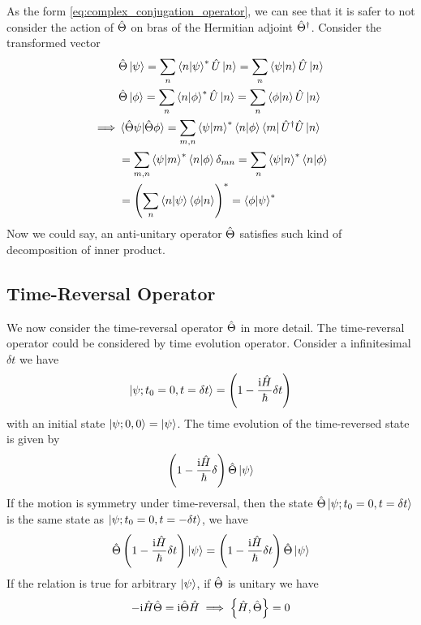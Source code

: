 As the form \cref{eq:complex_conjugation_operator}, we can see that it is safer to not consider the action of $\hat{\Theta}$ on bras of the Hermitian adjoint $\hat{\Theta}^ \dag$. Consider the transformed vector 
\begin{align*}
    &\hat{\Theta} \ket{\psi} = \sum_n \braket{n|\psi}^* \hat{U} \ket{n} = \sum_n \braket{\psi|n} \hat{U} \ket{n} \\
    &\hat{\Theta} \ket{\phi} = \sum_n \braket{n|\phi}^* \hat{U} \ket{n} = \sum_n \braket{\phi|n} \hat{U} \ket{n} \\
    \implies & \braket{\hat{\Theta} \psi|\hat{\Theta} \phi} = \sum_{m,n} \braket{\psi|m}^* \braket{n|\phi} \bra{m} \hat{U}^ \dag \hat{U} \ket{n} \\
    &= \sum_{m,n} \braket{\psi|m}^* \braket{n|\phi} \delta_{mn} = \sum_n \braket{\psi|n}^* \braket{n|\phi} \\
    &= \left( \sum_n \braket{n|\psi} \braket{\phi|n} \right)^* = \braket{\phi|\psi}^*
\end{align*}
Now we could say, an anti-unitary operator $\hat{\Theta}$ satisfies such kind of decomposition of inner product.
\subsection{Time-Reversal Operator}

We now consider the time-reversal operator $\hat{\Theta}$ in more detail. The time-reversal operator could be considered by time evolution operator. Consider a infinitesimal $\delta t$ we have
\begin{align*}
    \ket{\psi;t_0=0,t= \delta t} = \left(1 - \frac{\mathrm{i} \hat{H}}{\hbar} \delta t\right)
\end{align*}
with an initial state $\ket{\psi;0,0} = \ket{\psi}$. The time evolution of the time-reversed state is given by
\begin{align*}
    \left(1 - \frac{\mathrm{i} \hat{H}}{\hbar} \delta\right) \hat{\Theta} \ket{\psi}
\end{align*}
If the motion is symmetry under time-reversal, then the state $\hat{\Theta} \ket{\psi; t_0 =0, t= \delta t}$ is the same state as $\ket{\psi; t_0 =0, t= - \delta t}$, we have
\begin{align*}
    \hat{\Theta} \left(1 - \frac{\mathrm{i} \hat{H}}{\hbar} \delta t\right) \ket{\psi} = \left(1 - \frac{\mathrm{i} \hat{H}}{\hbar} \delta t\right) \hat{\Theta} \ket{\psi}
\end{align*}
If the relation is true for arbitrary $\ket{\psi}$, if $\hat{\Theta}$ is unitary we have
\begin{align*}
    - \mathrm{i} \hat{H} \hat{\Theta} = \mathrm{i} \hat{\Theta} \hat{H} \implies \left\{ \hat{H} , \hat{\Theta} \right\} = 0
\end{align*}

